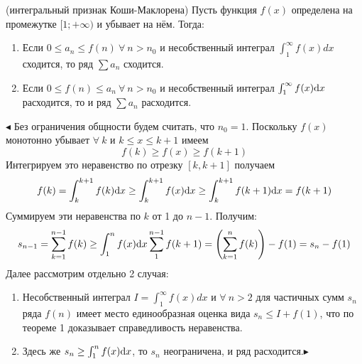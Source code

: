 \begin{theorem}(интегральный признак Коши-Маклорена)
Пусть функция $f(x)$ определена на промежутке $[1;+\infty)$ и убывает на нём. Тогда:
\begin{enumerate}
\item Если $0\le{a_n}\le{f(n)}\ \forall\ n>n_0$ и несобственный интеграл $\int_1^{\infty}f(x)dx$ сходится, то ряд $\sum{a_n}$ сходится.
\item Если $0\le{f(n)}\le{a_n}\ \forall\ n>n_0$ и несобственный интеграл $\int_1^{\infty}f(x){\rm d}x$ расходится, то и ряд $\sum{a_n}$ расходится.
\end{enumerate}
\end{theorem}
$\blacktriangleleft$ Без ограничения общности будем считать, что $n_0=1$. Поскольку $f(x)$ монотонно убывает $\forall\ k$ и $k\le{x}\le{k+1}$ имеем
$$f(k)\ge{f(x)}\ge{f(k+1)}$$
Интегрируем это неравенство по отрезку $[k,k+1]$ получаем
$$f(k)=\int_k^{k+1}f(k){\rm d}x\ge\int_k^{k+1}f(x){\rm d}x\ge\int_k^{k+1}f(k+1){\rm d}x=f(k+1)$$
Суммируем эти неравенства по $k$ от 1 до $n-1$. Получим:
$$s_{n-1}=\sum_{k=1}^{n-1}f(k)\ge\int_1^n{f(x)}{\rm d}x\sum_1^{n-1}f(k+1)=\left(\sum_{k=1}^n{f(k)}\right)-f(1)=s_n-f(1)$$
Далее рассмотрим отдельно 2 случая:
\begin{enumerate}
\item Несобственный интеграл $I=\int_1^{\infty}f(x)dx$ и $\forall\ n>2$ для частичных сумм $s_n$ ряда $f(n)$ имеет место единообразная оценка вида $s_n\le{I}+f(1)$, что по теореме 1 доказывает справедливость неравенства.
\item Здесь же $s_n\ge\int_1^n{f(x)}{\rm d}x$, то $s_n$ неограничена, и ряд расходится.$\blacktriangleright$
\end{enumerate}

